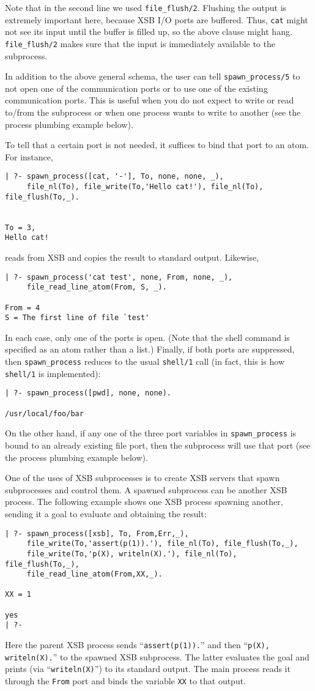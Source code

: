 Note that in the second line we used {\tt file\_flush/2}. Flushing the
output is extremely important here, because XSB I/O ports are buffered.
Thus, {\tt cat} might not see its input until the buffer is filled up, so
the above clause might hang. {\tt file\_flush/2} makes sure that the input
is immediately available to the subprocess.

In addition to the above general schema, the user can tell
\verb|spawn_process/5| to not open one of the communication ports or to
use one of the existing communication ports.  This is useful when you do
not expect to write or read to/from the subprocess or when one process
wants to write to another (see the process plumbing example below).

To tell that a certain port is not needed, it suffices to bind that port to
an atom.  For instance,
\begin{verbatim}
| ?- spawn_process([cat, '-'], To, none, none, _),
     file_nl(To), file_write(To,'Hello cat!'), file_nl(To), file_flush(To,_).


To = 3,
Hello cat!
\end{verbatim}
reads from XSB and copies the result to standard output. Likewise,
\begin{verbatim}
| ?- spawn_process('cat test', none, From, none, _),
     file_read_line_atom(From, S, _).

From = 4
S = The first line of file `test'
\end{verbatim}
In each case, only one of the ports is open. (Note that the shell command
is specified as an atom rather than a list.) Finally, if both ports are
suppressed, then \verb|spawn_process| reduces to the usual
{\tt shell/1} call (in fact, this is how {\tt shell/1} is implemented):
\begin{verbatim}
| ?- spawn_process([pwd], none, none).

/usr/local/foo/bar
\end{verbatim}
On the other hand, if any one of the three port variables in
\verb|spawn_process| is bound to an already existing file port, then the
subprocess will use that port (see the process plumbing example below).

One of the uses of XSB subprocesses is to create XSB servers that spawn
subprocesses and control them. A spawned subprocess can be another XSB
process. The following example shows one XSB process spawning another,
sending it a goal to evaluate and obtaining the result:
\begin{verbatim}
| ?- spawn_process([xsb], To, From,Err,_),
     file_write(To,'assert(p(1)).'), file_nl(To), file_flush(To,_),
     file_write(To,'p(X), writeln(X).'), file_nl(To), file_flush(To,_), 
     file_read_line_atom(From,XX,_).  

XX = 1

yes
| ?-
\end{verbatim}
Here the parent XSB process sends ``\verb|assert(p(1)).|'' and then
``\verb|p(X), writeln(X).|'' to the spawned XSB subprocess. The latter
evaluates the goal and prints (via ``\verb|writeln(X)|'')
to its standard output. The main process reads it through the {\tt From}
port and binds the variable {\tt XX} to that output.

